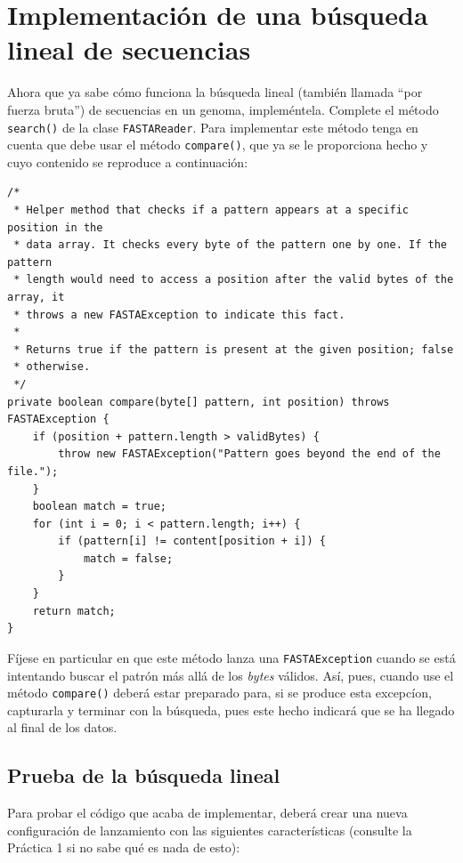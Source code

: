\documentclass[10pt,a4paper,spanish]{article}
\newcommand{\code}[1]{\texttt{#1}}
\begin{document}
\section{Implementación de una búsqueda lineal de secuencias}
\label{sec:laboratorio}

Ahora que ya sabe cómo funciona la búsqueda lineal (también llamada ``por fuerza bruta'') de secuencias en un genoma, impleméntela. Complete el método \code{search()} de la clase \code{FASTAReader}. Para implementar este método tenga en cuenta que debe usar el método \code{compare()}, que ya se le proporciona hecho y cuyo contenido se reproduce a continuación:


\begin{verbatim}
/*
 * Helper method that checks if a pattern appears at a specific position in the
 * data array. It checks every byte of the pattern one by one. If the pattern
 * length would need to access a position after the valid bytes of the array, it
 * throws a new FASTAException to indicate this fact.
 * 
 * Returns true if the pattern is present at the given position; false
 * otherwise.
 */
private boolean compare(byte[] pattern, int position) throws FASTAException {
    if (position + pattern.length > validBytes) {
        throw new FASTAException("Pattern goes beyond the end of the file.");
    }
    boolean match = true;
    for (int i = 0; i < pattern.length; i++) {
        if (pattern[i] != content[position + i]) {
            match = false;
        }
    }
    return match;
}
\end{verbatim}

Fíjese en particular en que este método lanza una \code{FASTAException} cuando se está intentando buscar el patrón más allá de los \textit{bytes} válidos. Así, pues, cuando use el método \code{compare()} deberá estar preparado para, si se produce esta excepcíon, capturarla y terminar con la búsqueda, pues este hecho indicará que se ha llegado al final de los datos.

\subsection{Prueba de la búsqueda lineal}

Para probar el código que acaba de implementar, deberá crear una nueva configuración de lanzamiento con las siguientes características (consulte la Práctica 1 si no sabe qué es nada de esto):
\end{document}
